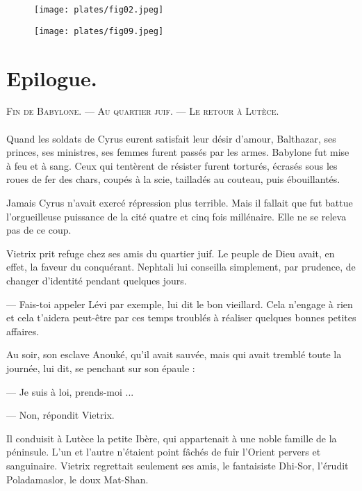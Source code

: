 \documentclass[a4paper, 11pt, oneside, polutonikogreek, french]{article}
\begin{document}
\begin{figure}[H]
\centering
\texttt{[image: plates/fig02.jpeg]}
\end{figure}
\clearpage
\begin{figure}[H]
\centering
\texttt{[image: plates/fig09.jpeg]}
\end{figure}
\section{Epilogue.}
\begin{center}
\scshape
\small
Fin de Babylone. --- Au quartier juif. --- Le retour à Lutèce.
\end{center}
\paragraph{}
Quand les soldats de Cyrus eurent satisfait leur désir d'amour, Balthazar, ses princes, ses ministres, ses femmes furent passés par les armes. Babylone fut mise à feu et à sang. Ceux qui tentèrent de résister furent torturés, écrasés sous les roues de fer des chars, coupés à la scie, tailladés au couteau, puis ébouillantés.

Jamais Cyrus n'avait exercé répression plus terrible. Mais il fallait que fut battue l'orgueilleuse puissance de la cité quatre et cinq fois millénaire. Elle ne se releva pas de ce coup.

\bigskip
\centerline{\EightStarTaper}
\centerline{\EightStarTaper\EightStarTaper}
\bigskip

Vietrix prit refuge chez ses amis du quartier juif. Le peuple de Dieu avait, en effet, la faveur du conquérant. Nephtali lui conseilla simplement, par prudence, de changer d'identité pendant quelques jours.

--- Fais-toi appeler Lévi par exemple, lui dit le bon vieillard. Cela n'engage à rien et cela t'aidera peut-être par ces temps troublés à réaliser quelques bonnes petites affaires.

Au soir, son esclave Anouké, qu'il avait sauvée, mais qui avait tremblé toute la journée, lui dit, se penchant sur son épaule :

--- Je suis à loi, prends-moi ...

--- Non, répondit Vietrix.

\bigskip
\centerline{\EightStarTaper}
\centerline{\EightStarTaper\EightStarTaper}
\bigskip

Il conduisit à Lutèce la petite Ibère, qui appartenait à une noble famille de la péninsule. L'un et l'autre n'étaient point fâchés de fuir l'Orient pervers et sanguinaire. Vietrix regrettait seulement ses amis, le fantaisiste Dhi-Sor, l'érudit Poladamaslor, le doux Mat-Shan.
\end{document}
